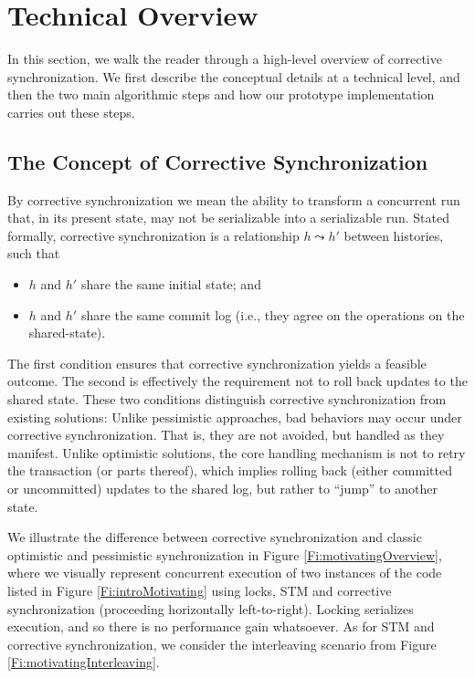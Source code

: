 \section{Technical Overview}

In this section, we walk the reader through a high-level overview of corrective synchronization. We first describe the conceptual details at a technical level, and then the two main algorithmic steps and how our prototype implementation carries out these steps.

\subsection{The Concept of Corrective Synchronization}

By corrective synchronization we mean the ability to transform a concurrent run that, in its present state, may not be serializable into a serializable run. Stated formally, corrective synchronization is a relationship $h \leadsto h'$ between histories, such that
\begin{itemize}
	\item $h$ and $h'$ share the same initial state; and
	\item $h$ and $h'$ share the same commit log (i.e., they agree on the operations on the shared-state).
\end{itemize} 

The first condition ensures that corrective synchronization yields a feasible outcome. The second is effectively the requirement not to roll back updates to the shared state. These two conditions distinguish corrective synchronization from existing solutions: Unlike pessimistic approaches, bad behaviors may occur under corrective synchronization. That is, they are not avoided, but handled as they manifest. Unlike optimistic solutions, the core handling mechanism is not to retry the transaction (or parts thereof), which implies rolling back (either committed or uncommitted) updates to the shared log, but rather to ``jump'' to another state.

We illustrate the difference between corrective synchronization and classic optimistic and pessimistic synchronization in Figure \ref{Fi:motivatingOverview}, where we visually represent concurrent execution of two instances of the code listed in Figure \ref{Fi:introMotivating} using locks, STM and corrective synchronization (proceeding horizontally left-to-right). Locking serializes execution, and so there is no performance gain whatsoever. As for STM and corrective synchronization, we consider the interleaving scenario from Figure \ref{Fi:motivatingInterleaving}. 

